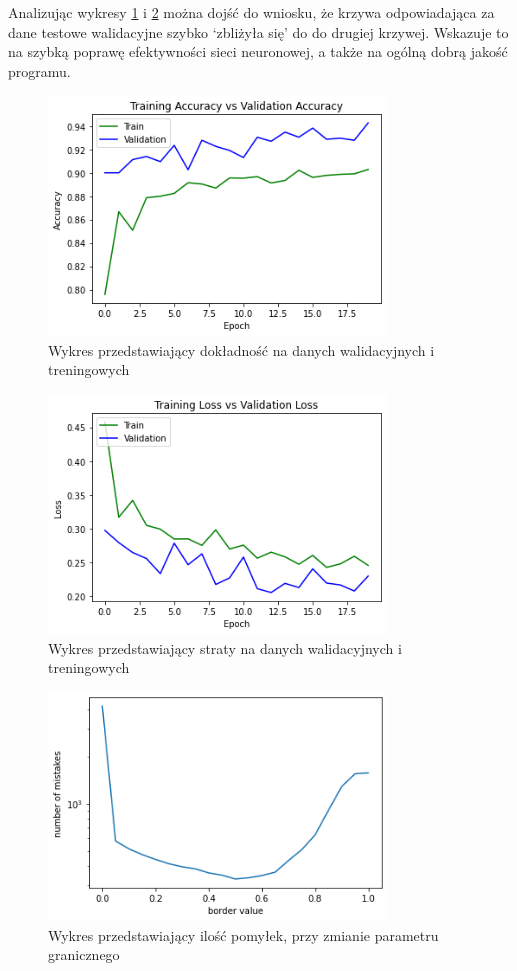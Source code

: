 \documentclass[12pt]{article}
\begin{document}
	Analizując wykresy \ref{fig:accuracy} i \ref{fig:loss} można dojść do wniosku, że krzywa odpowiadająca za dane testowe walidacyjne szybko ‘zbliżyła się’ do do drugiej krzywej. Wskazuje to na szybką poprawę efektywności sieci neuronowej, a także na ogólną dobrą jakość programu.
	\begin{figure}[H]
		\centering
		\includegraphics[width=0.8\textwidth]{accuracy.png}
		\caption{Wykres przedstawiający dokładność na danych walidacyjnych i treningowych}
		\label{fig:accuracy}
	\end{figure}
	\begin{figure}[H]
		\centering
		\includegraphics[width=0.8\textwidth]{loss.png}
		\caption{Wykres przedstawiający straty na danych walidacyjnych i treningowych}
		\label{fig:loss}
	\end{figure}
	\begin{figure}[H]
		\centering
		\includegraphics[width=0.8\textwidth]{accidents.png}
		\caption{Wykres przedstawiający ilość pomyłek, przy zmianie parametru granicznego}
		\label{fig:accidents}
	\end{figure}
\end{document}

